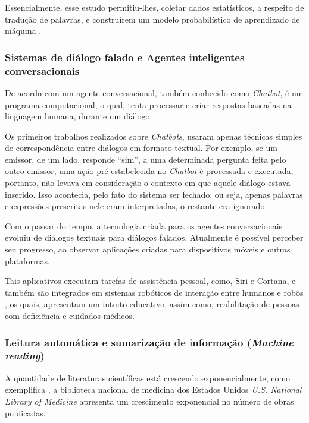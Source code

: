 Essencialmente, esse estudo permitiu-lhes, coletar dados estatísticos, a respeito de tradução de palavras, e construírem um modelo probabilístico de aprendizado de máquina \cite{Hirschberg261}.

\subsubsection{Sistemas de diálogo falado e Agentes inteligentes conversacionais}

De acordo com \cite{agenteConversacional:17} um agente conversacional, também conhecido como \textit{Chatbot}, é um programa computacional, o qual, tenta processar e criar respostas baseadas na linguagem humana, durante um diálogo.

Os primeiros trabalhos realizados sobre \textit{Chatbots}, usaram apenas técnicas simples de correspondência entre diálogos em formato textual. Por exemplo, se um emissor, de um lado, responde “sim”, a uma determinada pergunta feita pelo outro emissor, uma ação pré estabelecida no \textit{Chatbot} é processada e executada, portanto, não levava em consideração o contexto em que aquele diálogo estava inserido. Isso acontecia, pelo fato do sistema ser fechado, ou seja, apenas palavras e expressões prescritas nele eram interpretadas, o restante era ignorado.

Com o passar do tempo, a tecnologia criada para os agentes conversacionais evoluiu de diálogos textuais para diálogos falados. Atualmente é possível perceber seu progresso, ao observar aplicações criadas para dispositivos móveis e outras plataformas. 

Tais aplicativos executam tarefas de assistência pessoal, como, Siri e Cortana, e também são integrados em sistemas robóticos de interação entre humanos e robôs \cite{roboticaAssistida:15}, os quais, apresentam um intuito educativo, assim como, reabilitação de pessoas com deficiência e cuidados médicos.

\subsubsection{Leitura automática e sumarização de informação (\textit{Machine reading})}

A quantidade de literaturas científicas está crescendo exponencialmente, como exemplifica \cite{Hirschberg261}, a biblioteca nacional de medicina dos Estados Unidos \textit{U.S. National Library of Medicine} apresenta um crescimento exponencial no número de obras publicadas.

